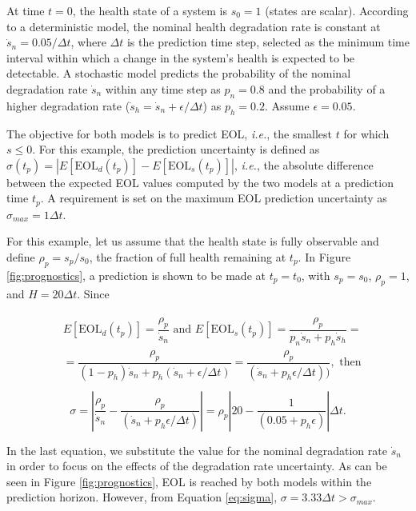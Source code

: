 \begin{ex}
\label{ex:eol}

At time $t=0$, the health state of a system is $s_0 = 1$ (states are scalar). According to a deterministic model, the nominal health degradation rate is constant at $\dot s_n = 0.05/\Delta t$, where $\Delta t$ is the prediction time step, selected as the minimum time interval within which a change in the system's health is expected to be detectable. A stochastic model predicts the probability of the nominal degradation rate $\dot s_n$ within any time step as $p_n = 0.8$ and the probability of a higher degradation rate ($\dot s_h= \dot s_n + \epsilon / \Delta t$) as $p_h = 0.2$. Assume $\epsilon = 0.05$.

The objective for both models is to predict EOL, \textit{i.e.}, the smallest $t$ for which $s \leq 0$. For this example, the prediction uncertainty is defined as $\sigma(t_p) = |E[\text{EOL}_d(t_p)] - E[\text{EOL}_s(t_p)]|$, \textit{i.e.}, the absolute difference between the expected EOL values computed by the two models at a prediction time $t_p$. A requirement is set on the maximum EOL prediction uncertainty as $\sigma_\textit{max} = 1 \Delta t$. 
\end{ex}

For this example, let us assume that the health state is fully observable and define $\rho_p = s_p/s_0$, the fraction of full health remaining at $t_p$. In Figure \ref{fig:prognostics}, a prediction is shown to be made at $t_p = t_0$, with $s_p = s_0$, $\rho_p = 1$, and $H=20 \Delta t$. Since

\begin{align*}
\begin{split}
	& E[\text{EOL}_d(t_p)] = \dfrac{\rho_p}{\dot s_n} \text{ and } E[\text{EOL}_s(t_p)] = \dfrac{\rho_p}{p_n\dot s_n + p_h \dot s_h} = \\
	& = \dfrac{\rho_p}{(1-p_h)\dot s_n + p_h (\dot s_n+\epsilon / \Delta t)} = \dfrac{\rho_p}{(\dot s_n + p_h \epsilon / \Delta t))}, \text{ then}\\
\end{split}
\end{align*}
\begin{equation}
\sigma = \left|\dfrac{\rho_p}{\dot s_n} - \dfrac{\rho_p}{(\dot s_n + p_h \epsilon / \Delta t)} \right| = \rho_p \left |20 - \dfrac{1}{(0.05 + p_h \epsilon)} \right|\Delta t.
\label{eq:sigma}
\end{equation}

In the last equation, we substitute the value for the nominal degradation rate $\dot s_n$ in order to focus on the effects of the degradation rate uncertainty. As can be seen in Figure \ref{fig:prognostics}, EOL is reached by both models within the prediction horizon. However, from Equation \ref{eq:sigma}, $\sigma  = 3.33\Delta t > \sigma_{max}$.

